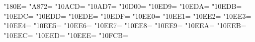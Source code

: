 \XeTeXcharclass"180E=\KclassArabL
\XeTeXcharclass"A872=\KclassArabL
\XeTeXcharclass"10ACD=\KclassArabL
\XeTeXcharclass"10AD7=\KclassArabL
\XeTeXcharclass"10D00=\KclassArabL
\XeTeXcharclass"10ED9=\KclassArabL
\XeTeXcharclass"10EDA=\KclassArabL
\XeTeXcharclass"10EDB=\KclassArabL
\XeTeXcharclass"10EDC=\KclassArabL
\XeTeXcharclass"10EDD=\KclassArabL
\XeTeXcharclass"10EDE=\KclassArabL
\XeTeXcharclass"10EDF=\KclassArabL
\XeTeXcharclass"10EE0=\KclassArabL
\XeTeXcharclass"10EE1=\KclassArabL
\XeTeXcharclass"10EE2=\KclassArabL
\XeTeXcharclass"10EE3=\KclassArabL
\XeTeXcharclass"10EE4=\KclassArabL
\XeTeXcharclass"10EE5=\KclassArabL
\XeTeXcharclass"10EE6=\KclassArabL
\XeTeXcharclass"10EE7=\KclassArabL
\XeTeXcharclass"10EE8=\KclassArabL
\XeTeXcharclass"10EE9=\KclassArabL
\XeTeXcharclass"10EEA=\KclassArabL
\XeTeXcharclass"10EEB=\KclassArabL
\XeTeXcharclass"10EEC=\KclassArabL
\XeTeXcharclass"10EED=\KclassArabL
\XeTeXcharclass"10EEE=\KclassArabL
\XeTeXcharclass"10FCB=\KclassArabL


